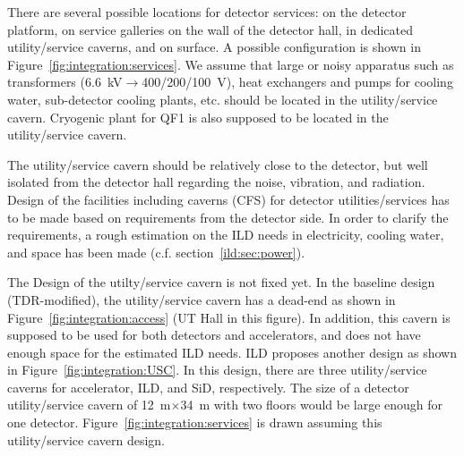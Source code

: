There are several possible locations for detector services: on the detector platform, on service galleries on the wall of the detector hall, in dedicated utility/service caverns, and on surface. A possible configuration is shown in Figure~\ref{fig:integration:services}.
We assume that large or noisy apparatus such as transformers (6.6~kV$\rightarrow$400/200/100~V), heat exchangers and pumps for cooling water, sub-detector cooling plants, etc. should be located in the utility/service cavern. Cryogenic plant for QF1 is also supposed to be located in the utility/service cavern.

The utility/service cavern should be relatively close to the detector, but well isolated from the detector hall  regarding the noise, vibration, and radiation. Design of the facilities including caverns (CFS) for detector utilities/services has to be made based on requirements from the detector side. In order to clarify the requirements, a rough estimation on the ILD needs in electricity, cooling water, and space has been made (c.f. section~\ref{ild:sec:power}). 

The Design of the utilty/service cavern is not fixed yet. In the baseline design (TDR-modified), the utility/service cavern has a dead-end as shown in Figure~\ref{fig:integration:access} (UT Hall in this figure). In addition, this cavern is supposed to be used for both detectors and accelerators, and does not have enough space for the estimated ILD needs. 
ILD proposes another design as shown in Figure~\ref{fig:integration:USC}. In this design, there are three utility/service caverns for accelerator, ILD, and SiD, respectively. The size of a detector utility/service cavern of 12~m$\times$34~m with two floors would be large enough for one detector.   Figure~\ref{fig:integration:services} is drawn assuming this utility/service cavern design.

